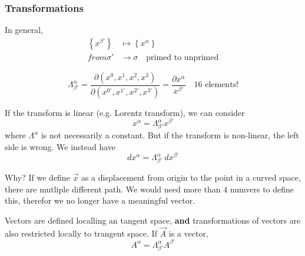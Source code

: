 \documentclass[a4paper]{article} %
\begin{document}
\subsubsection{Transformations}
In general,
\begin{align*}
\left\{x^{\beta'}\right\}&\mapsto \left\{x^{\alpha}\right\}\\
from \sigma' &\to \sigma\quad\text{primed to unprimed}
\end{align*}

\begin{equation}
\Lambda^{\alpha}_{\beta'}=\frac{\partial (x^{0},x^{1},x^{2},x^{3})}{\partial (x^{0'},x^{1'},x^{2'},x^{3'})}
=\frac{\partial x^{\alpha}}{x^{\beta'}}\quad \text{16 elements!}
\end{equation}

If the transform is linear (e.g. Lorentz transform), we can consider
\begin{equation}
x^{\alpha}=\Lambda^{\alpha}_{\beta'}x^{\beta'}
\end{equation}
where $\Lambda^{\alpha}$ is not necessarily a constant. But if the transform is non-linear, the left side is wrong. We instead have
\begin{equation}
dx^{\alpha}=\Lambda^{\alpha}_{\beta'}~dx^{\beta'}
\end{equation}

Why? If we define $\vec{x}$ as a displacement from origin to the point in a curved space, there are mutliple different path. We would need more than 4 numvers to define this, therefor we no longer have a meaningful vector. 

Vectors are defined localling an tangent space, \textbf{and} transformations of vectors are also restricted locally to trangent space. If $\vec{A}$ is a vector,
\begin{equation}
A^{\alpha}=\Lambda^{\alpha}_{\beta'}A^{\beta'}
\end{equation}
\end{document}
